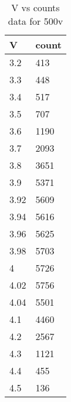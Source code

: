 \begin{table}[H]
    \centering
    \begin{tabular}{|l|l|}
    \hline
        V & count \\ \hline
        3.2 & 413 \\ \hline
        3.3 & 448 \\ \hline
        3.4 & 517 \\ \hline
        3.5 & 707 \\ \hline
        3.6 & 1190 \\ \hline
        3.7 & 2093 \\ \hline
        3.8 & 3651 \\ \hline
        3.9 & 5371 \\ \hline
        3.92 & 5609 \\ \hline
        3.94 & 5616 \\ \hline
        3.96 & 5625 \\ \hline
        3.98 & 5703 \\ \hline
        4 & 5726 \\ \hline
        4.02 & 5756 \\ \hline
        4.04 & 5501 \\ \hline
        4.1 & 4460 \\ \hline
        4.2 & 2567 \\ \hline
        4.3 & 1121 \\ \hline
        4.4 & 455 \\ \hline
        4.5 & 136 \\ \hline
    \end{tabular}
    \caption{V vs counts data for 500v}
    \label{tab:500}
\end{table}